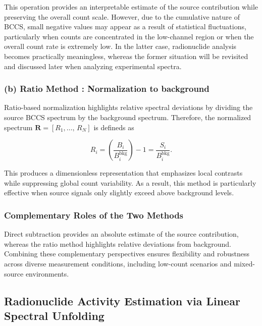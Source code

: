 \documentclass[10pt]{wlscirep}
\begin{document}
This operation provides an interpretable estimate of the source contribution while preserving the overall count scale. However, due to the cumulative nature of BCCS, small negative values may appear as a result of statistical fluctuations, particularly when counts are concentrated in the low-channel region or when the overall count rate is extremely low. In the latter case, radionuclide analysis becomes practically meaningless, whereas the former situation will be revisited and discussed later when analyzing experimental spectra.


\subsubsection*{(b) Ratio Method : Normalization to background} 

Ratio-based normalization highlights relative spectral deviations by dividing the source BCCS spectrum by the background spectrum. Therefore, the normalized spectrum $\mathbf{R}=[R_1,\ldots,\,R_N]$ is defineds as

\begin{equation}
R_i = \left(\dfrac{B_i}{B^{\textrm{bkg}}_i}\right) -1=\dfrac{S_i}{B_i^{\text{bkg}}}.
\end{equation}

This produces a dimensionless representation that emphasizes local contrasts while suppressing global count variability. As a result, this method is particularly effective when source signals only slightly exceed above background levels.

\subsubsection*{Complementary Roles of the Two Methods} 

Direct subtraction provides an absolute estimate of the source contribution, whereas the ratio method highlights relative deviations from background. Combining these complementary perspectives ensures flexibility and robustness across diverse measurement conditions, including low-count scenarios and mixed-source environments.

\subsection*{Radionuclide Activity Estimation via Linear Spectral Unfolding}
\end{document}
